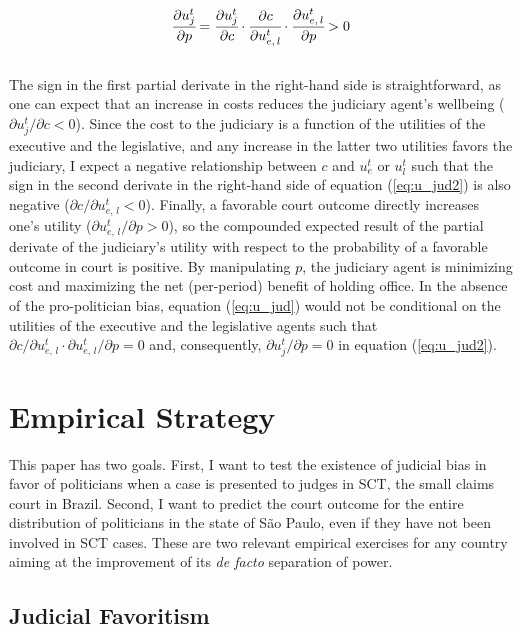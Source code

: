 \documentclass[11pt]{article}
\newcommand{\refp}[1]{(\ref{#1})}
\begin{document}
\begin{equation} \label{eq:u_jud2}
  \cfrac{\partial u_{j}^{t}}{\partial p} = \cfrac{\partial u_{j}^{t}}{\partial c} \cdot \cfrac{\partial c}{\partial u_{e, \, l}^{t}} \cdot \cfrac{\partial u_{e, \, l}^{t}}{\partial p} > 0
\end{equation} \\

The sign in the first partial derivate in the right-hand side is straightforward, as one can expect that an increase in costs reduces the judiciary agent's wellbeing ($\partial u_{j}^{t} / \partial c < 0$). Since the cost to the judiciary is a function of the utilities of the executive and the legislative, and any increase in the latter two utilities favors the judiciary, I expect a negative relationship between $c$ and $u_{e}^{t}$ or $u_{l}^{t}$ such that the sign in the second derivate in the right-hand side of equation \refp{eq:u_jud2} is also negative ($\partial c / \partial u_{e, \, l}^{t} < 0$). Finally, a favorable court outcome directly increases one's utility ($\partial u_{e, \, l}^{t} / \partial p > 0$), so the compounded expected result of the partial derivate of the judiciary's utility with respect to the probability of a favorable outcome in court is positive. By manipulating $p$, the judiciary agent is minimizing cost and maximizing the net (per-period) benefit of holding office. In the absence of the pro-politician bias, equation \refp{eq:u_jud} would not be conditional on the utilities of the executive and the legislative agents such that $\partial c / \partial u_{e, \, l}^{t} \cdot \partial u_{e, \, l}^{t} / \partial p = 0$ and, consequently, $\partial u_{j}^{t} / \partial p = 0$ in equation \refp{eq:u_jud2}.

\section{Empirical Strategy} \label{sec:methods_paper2}

This paper has two goals. First, I want to test the existence of judicial bias in favor of politicians when a case is presented to judges in SCT, the small claims court in Brazil. Second, I want to predict the court outcome for the entire distribution of politicians in the state of São Paulo, even if they have not been involved in SCT cases. These are two relevant empirical exercises for any country aiming at the improvement of its \emph{de facto} separation of power.

\subsection{Judicial Favoritism} \label{subsec:methods1_paper2}
\end{document}
